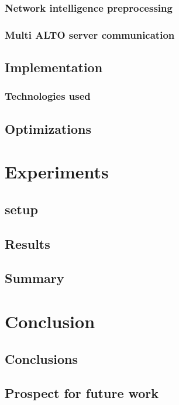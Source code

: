 \documentclass[
  oneside,
  11pt, a4paper,
  footinclude=true,
  headinclude=true,
  cleardoublepage=empty
]{scrbook}
\begin{document}
    \subsection{Network intelligence preprocessing}
	
	\subsection{Multi ALTO server communication}	
	\label{ssec:multi-alto}
	
    \section{Implementation}
    \subsection{Technologies used}
    \section{Optimizations}


	\chapter{Experiments}
	\section{setup}
    \section{Results}
	\section{Summary}

	\chapter{Conclusion}
	\section{Conclusions}
	\section{Prospect for future work}
			
\end{document}
